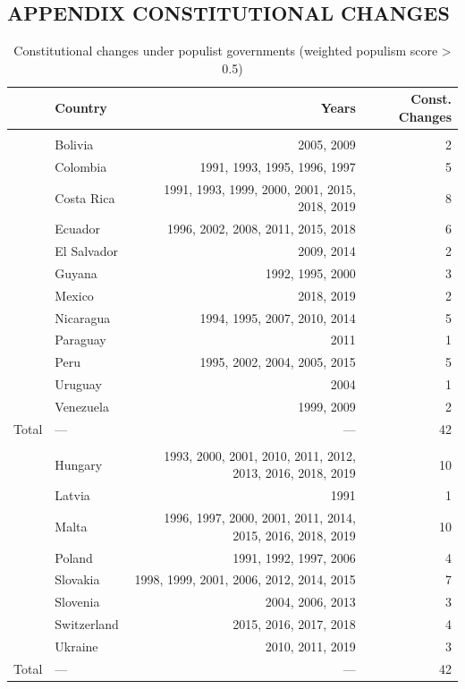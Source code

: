 \documentclass[
  abstract]{article}
\begin{document}
\newpage{}

\hypertarget{appendix-constitutional-changes}{%
\subsection{APPENDIX CONSTITUTIONAL
CHANGES}\label{appendix-constitutional-changes}}

\newpage{}

\scriptsize

\hypertarget{tbl-populistchanges}{}
\begin{longtable}{l|lrr}
\caption{\label{tbl-populistchanges}Constitutional changes under populist governments (weighted populism
score \textgreater{} 0.5) }\tabularnewline

\toprule
\multicolumn{1}{l}{} & \textbf{Country} & \textbf{Years} & \textbf{Const. Changes} \\ 
\midrule\addlinespace[2.5pt]
\multicolumn{4}{l}{Latin America} \\ 
\midrule\addlinespace[2.5pt]
 & Bolivia & 2005, 2009 & 2 \\ 
 & Colombia & 1991, 1993, 1995, 1996, 1997 & 5 \\ 
 & Costa Rica & 1991, 1993, 1999, 2000, 2001, 2015, 2018, 2019 & 8 \\ 
 & Ecuador & 1996, 2002, 2008, 2011, 2015, 2018 & 6 \\ 
 & El Salvador & 2009, 2014 & 2 \\ 
 & Guyana & 1992, 1995, 2000 & 3 \\ 
 & Mexico & 2018, 2019 & 2 \\ 
 & Nicaragua & 1994, 1995, 2007, 2010, 2014 & 5 \\ 
 & Paraguay & 2011 & 1 \\ 
 & Peru & 1995, 2002, 2004, 2005, 2015 & 5 \\ 
 & Uruguay & 2004 & 1 \\ 
 & Venezuela & 1999, 2009 & 2 \\ 
\midrule 
Total & — & — & 42 \\ 
\midrule\addlinespace[2.5pt]
\multicolumn{4}{l}{Europe} \\ 
\midrule\addlinespace[2.5pt]
 & Hungary & 1993, 2000, 2001, 2010, 2011, 2012, 2013, 2016, 2018, 2019 & 10 \\ 
 & Latvia & 1991 & 1 \\ 
 & Malta & 1996, 1997, 2000, 2001, 2011, 2014, 2015, 2016, 2018, 2019 & 10 \\ 
 & Poland & 1991, 1992, 1997, 2006 & 4 \\ 
 & Slovakia & 1998, 1999, 2001, 2006, 2012, 2014, 2015 & 7 \\ 
 & Slovenia & 2004, 2006, 2013 & 3 \\ 
 & Switzerland & 2015, 2016, 2017, 2018 & 4 \\ 
 & Ukraine & 2010, 2011, 2019 & 3 \\ 
\midrule 
Total & — & — & 42 \\ 
\bottomrule
\end{longtable}
\end{document}
